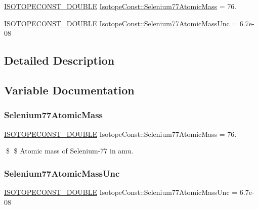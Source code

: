 \begin{DoxyCompactItemize}
\item 
\mbox{\hyperlink{group___isotope_const-_macros_ga8f45a7272ce02c0b4c65c44636ed719a}{I\+S\+O\+T\+O\+P\+E\+C\+O\+N\+S\+T\+\_\+\+D\+O\+U\+B\+LE}} \mbox{\hyperlink{group___isotope_const-_selenium-_se77_ga81ddc74d675777959854ac2231938a94}{Isotope\+Const\+::\+Selenium77\+Atomic\+Mass}} = 76.
\item 
\mbox{\hyperlink{group___isotope_const-_macros_ga8f45a7272ce02c0b4c65c44636ed719a}{I\+S\+O\+T\+O\+P\+E\+C\+O\+N\+S\+T\+\_\+\+D\+O\+U\+B\+LE}} \mbox{\hyperlink{group___isotope_const-_selenium-_se77_ga5e58f8359f3ec55722c335f964147f2b}{Isotope\+Const\+::\+Selenium77\+Atomic\+Mass\+Unc}} = 6.\+7e-\/08
\end{DoxyCompactItemize}


\subsection{Detailed Description}


\subsection{Variable Documentation}
\mbox{\label{group___isotope_const-_selenium-_se77_ga81ddc74d675777959854ac2231938a94}} 
\subsubsection{\texorpdfstring{Selenium77\+Atomic\+Mass}{Selenium77AtomicMass}}
{\footnotesize\ttfamily \mbox{\hyperlink{group___isotope_const-_macros_ga8f45a7272ce02c0b4c65c44636ed719a}{I\+S\+O\+T\+O\+P\+E\+C\+O\+N\+S\+T\+\_\+\+D\+O\+U\+B\+LE}} Isotope\+Const\+::\+Selenium77\+Atomic\+Mass = 76.}

\$ \$ Atomic mass of Selenium-\/77 in amu. \mbox{\label{group___isotope_const-_selenium-_se77_ga5e58f8359f3ec55722c335f964147f2b}} 
\subsubsection{\texorpdfstring{Selenium77\+Atomic\+Mass\+Unc}{Selenium77AtomicMassUnc}}
{\footnotesize\ttfamily \mbox{\hyperlink{group___isotope_const-_macros_ga8f45a7272ce02c0b4c65c44636ed719a}{I\+S\+O\+T\+O\+P\+E\+C\+O\+N\+S\+T\+\_\+\+D\+O\+U\+B\+LE}} Isotope\+Const\+::\+Selenium77\+Atomic\+Mass\+Unc = 6.\+7e-\/08}

